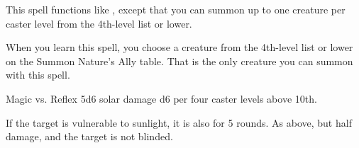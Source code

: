 \begin{spellheader}
\end{spellheader}
\begin{spellcontent}
    \spelleffect This spell functions like , except that you can summon up to one creature per caster level from the 4th-level list or lower.
    \par When you learn this spell, you choose a creature from the 4th-level list or lower on the Summon Nature's Ally table. That is the only creature you can summon with this spell.
    \spelldur{\durshort \dismissable}
\end{spellcontent}
\begin{spellfooter}

\end{spellfooter}

\begin{spellheader}
    \begin{spelltargetinginfo}
    \end{spelltargetinginfo}
\end{spellheader}
\begin{spellcontent}
    \begin{spelleffects}
        \begin{spellattack}{Magic vs. Reflex}
            \spellsuccess 5d6 solar damage \add d6 per four caster levels above 10th.

            If the target is vulnerable to sunlight, it is also \blinded for 5 rounds.
            \spellfailure As above, but half damage, and the target is not blinded.
        \end{spellattack}
    \end{spelleffects}
\end{spellcontent}
\begin{spellfooter}

\end{spellfooter}

